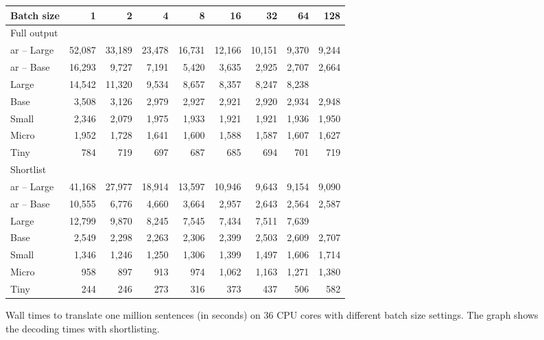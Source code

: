 \begin{figure}
  \centering

  
  \vspace{1\baselineskip}

  \begin{tabular}{lrrrrrrrr}
    \toprule
    Batch size & 1 & 2 & 4 & 8 & 16 & 32 & 64 & 128 \\


    \midrule
    Full output \\
    \acs{ar} -- Large & 52,087 & 33,189 & 23,478 & 16,731 & 12,166 & 10,151 & 9,370 & 9,244 \\
    \acs{ar} -- Base  & 16,293 &  9,727 &  7,191 &  5,420 &  3,635 &  2,925 & 2,707 & 2,664 \\
    \addlinespace
    Large & 14,542 & 11,320 & 9,534 & 8,657 & 8,357 & 8,247 & 8,238 & \\
    Base  &  3,508 &  3,126 & 2,979 & 2,927 & 2,921 & 2,920 & 2,934 & 2,948 \\
    Small &  2,346 &  2,079 & 1,975 & 1,933 & 1,921 & 1,921 & 1,936 & 1,950 \\
    Micro &  1,952 &  1,728 & 1,641 & 1,600 & 1,588 & 1,587 & 1,607 & 1,627 \\
    Tiny  &    784 &    719 &   697 &   687 &   685 &   694 &   701 &   719 \\


    \midrule
    Shortlist \\
    \acs{ar} -- Large & 41,168 & 27,977 & 18,914 & 13,597 & 10,946 & 9,643 & 9,154 & 9,090 \\
    \acs{ar} -- Base  & 10,555 &  6,776 &  4,660 &  3,664 &  2,957 & 2,643 & 2,564 & 2,587 \\
    \addlinespace
    Large & 12,799 & 9,870 & 8,245 & 7,545 & 7,434 & 7,511 & 7,639 & \\
    Base  &  2,549 & 2,298 & 2,263 & 2,306 & 2,399 & 2,503 & 2,609 & 2,707 \\
    Small &  1,346 & 1,246 & 1,250 & 1,306 & 1,399 & 1,497 & 1,606 & 1,714 \\
    Micro &    958 &   897 &   913 &   974 & 1,062 & 1,163 & 1,271 & 1,380 \\
    Tiny  &    244 &   246 &   273 &   316 &   373 &   437 &   506 &   582 \\


    \bottomrule
  \end{tabular}

  \caption{Wall times to translate one million sentences (in seconds) on 36 CPU
    cores with different batch size settings. The graph shows the decoding
    times with shortlisting.}%
  \label{fig:throughput:cpu36}
\end{figure}


